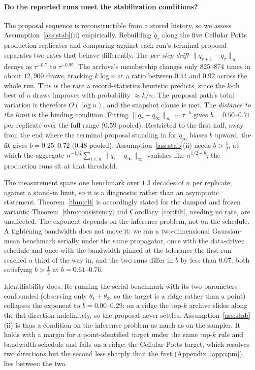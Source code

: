 \documentclass[10pt]{article}
\theoremstyle{plain}
\theoremstyle{definition}
\begin{document}
\paragraph{Do the reported runs meet the stabilization conditions?} The proposal sequence is reconstructible from a stored history, so we assess Assumption~\ref{ass:stab}(ii) empirically. Rebuilding $q_\tau$ along the five Cellular Potts production replicates and comparing against each run's terminal proposal separates two rates that behave differently. The \emph{per-step drift} $\|q_{\tau+1}-q_\tau\|_\infty$ decays as $\tau^{-0.7}$ to $\tau^{-0.95}$. The archive's membership changes only $825$--$874$ times in about $12{,}900$ draws, tracking $k\log n$ at a ratio between $0.54$ and $0.92$ across the whole run. This is the rate a record-statistics heuristic predicts, since the $k$-th best of $n$ draws improves with probability ${\approx}k/n$. The proposal path's total variation is therefore $O(\log n)$, and the snapshot clause is met. The \emph{distance to the limit} is the binding condition. Fitting $\|q_\tau-q_\infty\|_\infty\sim\tau^{-b}$ gives $b=0.50$--$0.71$ per replicate over the full range ($0.59$ pooled). Restricted to the first half, away from the end where the terminal proposal standing in for $q_\infty$ biases $b$ upward, the fit gives $b=0.25$--$0.72$ ($0.48$ pooled). Assumption~\ref{ass:stab}(ii) needs $b>\tfrac12$, at which the aggregate $n^{-1/2}\sum_{i\le n}\|q_i-q_\infty\|_\infty$ vanishes like $n^{1/2-b}$; the production runs sit at that threshold.

The measurement spans one benchmark over $1.3$ decades of $n$ per replicate, against a stand-in limit, so it is a diagnostic rather than an asymptotic statement. Theorem~\ref{thm:clt} is accordingly stated for the damped and frozen variants; Theorem~\ref{thm:consistency} and Corollary~\ref{cor:tilt}, needing no rate, are unaffected. The exponent depends on the inference problem, not on the schedule. A tightening bandwidth does not move it: we ran a two-dimensional Gaussian-mean benchmark serially under the same propagator, once with the data-driven schedule and once with the bandwidth pinned at the tolerance the first run reached a third of the way in, and the two runs differ in $b$ by less than $0.07$, both satisfying $b>\tfrac12$ at $b=0.61$--$0.76$.

Identifiability does. Re-running the serial benchmark with its two parameters confounded (observing only $\theta_1+\theta_2$, so the target is a ridge rather than a point) collapses the exponent to $b=0.00$--$0.29$: on a ridge the top-$k$ archive slides along the flat direction indefinitely, so the proposal never settles. Assumption~\ref{ass:stab}(ii) is thus a condition on the inference problem as much as on the sampler. It holds with a margin for a point-identified target under the same top-$k$ rule and bandwidth schedule and fails on a ridge; the Cellular Potts target, which resolves two directions but the second less sharply than the first (Appendix~\ref{app:cpm}), lies between the two.
\end{document}
